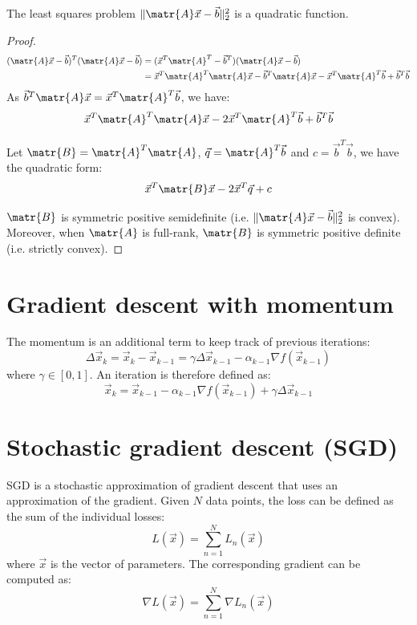 \begin{theorem}
    The least squares problem $\Vert \matr{A}\vec{x} - \vec{b} \Vert_2^2$ is a quadratic function.
\end{theorem}
\begin{proof}
    \[
        \begin{split}
            (\matr{A}\vec{x} - \vec{b})^T(\matr{A}\vec{x} - \vec{b}) &= (\vec{x}^T\matr{A}^T - \vec{b}^T)(\matr{A}\vec{x} - \vec{b}) \\
                &= \vec{x}^T\matr{A}^T\matr{A}\vec{x} - \vec{b}^T\matr{A}\vec{x} - \vec{x}^T\matr{A}^T\vec{b} + \vec{b}^T\vec{b} \\
        \end{split}
    \]
    As $\vec{b}^T\matr{A}\vec{x} = \vec{x}^T\matr{A}^T\vec{b}$, we have:
    \[ \vec{x}^T\matr{A}^T\matr{A}\vec{x} - 2\vec{x}^T\matr{A}^T\vec{b} + \vec{b}^T\vec{b} \]

    Let $\matr{B} = \matr{A}^T\matr{A}$, $\vec{q} = \matr{A}^T\vec{b}$ and $c = \vec{b}^T\vec{b}$, 
    we have the quadratic form:
    \[ \vec{x}^T\matr{B}\vec{x} - 2\vec{x}^T\vec{q} + c \]

    $\matr{B}$ is symmetric positive semidefinite (i.e. $\Vert \matr{A}\vec{x} - \vec{b} \Vert_2^2$ is convex).
    Moreover, when $\matr{A}$ is full-rank, $\matr{B}$ is symmetric positive definite (i.e. strictly convex).
\end{proof}



\section{Gradient descent with momentum}
The momentum is an additional term to keep track of previous iterations:
\[
    \Delta \vec{x}_k = \vec{x}_k - \vec{x}_{k-1} = \gamma \Delta \vec{x}_{k-1} - \alpha_{k-1}\nabla f(\vec{x}_{k-1})
\]
where $\gamma \in [0, 1]$. An iteration is therefore defined as:
\[
    \vec{x}_k = \vec{x}_{k-1} - \alpha_{k-1}\nabla f(\vec{x}_{k-1}) + \gamma \Delta\vec{x}_{k-1}
\]



\section{Stochastic gradient descent (SGD)}
SGD is a stochastic approximation of gradient descent that uses an approximation of the gradient.
Given $N$ data points, the loss can be defined as the sum of the individual losses:
\[ L(\vec{x}) = \sum_{n=1}^{N} L_n(\vec{x}) \]
where $\vec{x}$ is the vector of parameters.
The corresponding gradient can be computed as:
\[ \nabla L(\vec{x}) = \sum_{n=1}^{N} \nabla L_n(\vec{x}) \]

